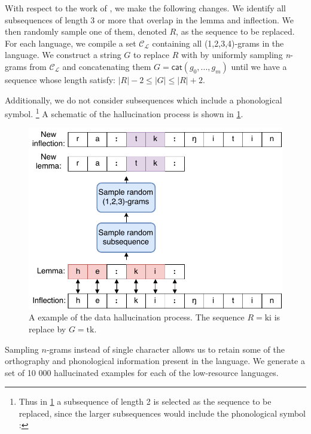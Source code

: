 \documentclass[11pt,a4paper]{article}
\begin{document}
With respect to the work of \citet{DBLP:conf/emnlp/AnastasopoulosN19},
we make the following changes. We identify all subsequences of length
$3$ or more that overlap in the lemma and inflection. We then randomly
sample one of them, denoted $R$, as the sequence to be replaced.  For
each language, we compile a set $\mathcal{C_L}$ containing all
(1,2,3,4)-grams in the language. We construct a string $G$ to replace
$R$ with by uniformly sampling \textit{n}-grams from $\mathcal{C_L}$ and
concatenating them $G = \mathsf{cat}(g_0, ..., g_m)$ until we have a sequence whose
length satisfy: $|R|-2 \leq |G| \leq |R|+2$.



Additionally, we do not consider subsequences which include a
phonological symbol. \footnote{Thus in \cref{fig:hall} a subsequence of
length 2 is selected as the sequence to be replaced, since the larger subsequences
would include the phonological symbol :}  A schematic of the hallucination
process is shown in \cref{fig:hall}.


\begin{figure}[h]
\centering
\includegraphics[scale=0.5]{hall.pdf}
\caption{\label{fig:hall} A example of the data hallucination process. The sequence $R=\text{ki}$ is replace by $G=\text{tk}$.}
\end{figure}


Sampling $n$-grams instead of single character allows us to retain
some of the orthography and phonological information present in the
language.  We generate a set of 10 000 hallucinated examples for each
of the low-resource languages.
\end{document}
